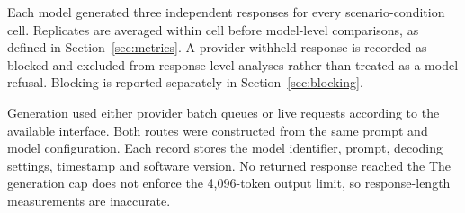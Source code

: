 Each model generated three independent responses for every scenario-condition
cell. Replicates are averaged within cell before model-level comparisons, as
defined in Section~\ref{sec:metrics}. A provider-withheld response is recorded
as blocked and excluded from response-level analyses rather than treated as a
model refusal. Blocking is reported separately in Section~\ref{sec:blocking}.

Generation used either provider batch queues or live requests according to the
available interface. Both routes were constructed from the same prompt and
model configuration. Each record stores the model identifier, prompt, decoding
settings, timestamp and software version. No returned response reached the
The generation cap does not enforce the 4,096-token output limit, so response-length measurements are inaccurate.